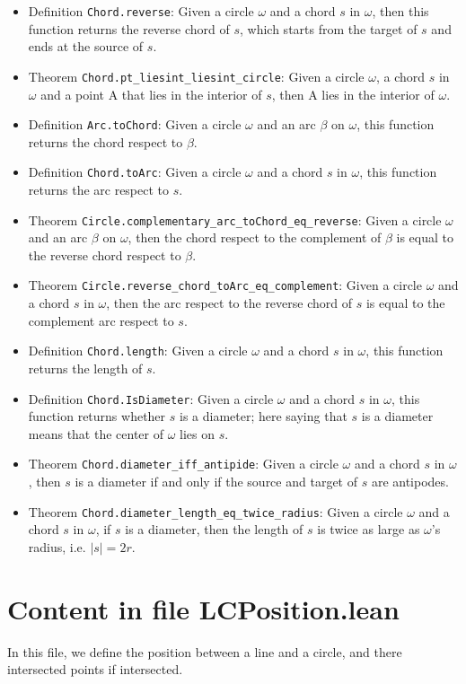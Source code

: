 \documentclass[12pt]{amsart}
\begin{document}
\begin{itemize}
    \item Definition \verb|Chord.reverse|: Given a circle $\omega$ and a chord $s$ in $\omega$, then this function returns the reverse chord of $s$, which starts from the target of $s$ and ends at the source of $s$.
    \item Theorem \verb|Chord.pt_liesint_liesint_circle|: Given a circle $\omega$, a chord $s$ in $\omega$ and a point A that lies in the interior of $s$, then A lies in the interior of $\omega$.
    \item Definition \verb|Arc.toChord|: Given a circle $\omega$ and an arc $\beta$ on $\omega$, this function returns the chord respect to $\beta$.
    \item Definition \verb|Chord.toArc|: Given a circle $\omega$ and a chord $s$ in $\omega$, this function returns the arc respect to $s$.
    \item Theorem \verb|Circle.complementary_arc_toChord_eq_reverse|: Given a circle $\omega$ and an arc $\beta$ on $\omega$, then the chord respect to the complement of $\beta$ is equal to the reverse chord respect to $\beta$.
    \item Theorem \verb|Circle.reverse_chord_toArc_eq_complement|: Given a circle $\omega$ and a chord $s$ in $\omega$, then the arc respect to the reverse chord of $s$ is equal to the complement arc respect to $s$.
    \item Definition \verb|Chord.length|: Given a circle $\omega$ and a chord $s$ in $\omega$, this function returns the length of $s$.
    \item Definition \verb|Chord.IsDiameter|: Given a circle $\omega$ and a chord $s$ in $\omega$, this function returns whether $s$ is a diameter; here saying that $s$ is a diameter means that the center of $\omega$ lies on $s$.
    \item Theorem \verb|Chord.diameter_iff_antipide|: Given a circle $\omega$ and a chord $s$ in $\omega$, then $s$ is a diameter if and only if the source and target of $s$ are antipodes.
    \item Theorem \verb|Chord.diameter_length_eq_twice_radius|: Given a circle $\omega$ and a chord $s$ in $\omega$, if $s$ is a diameter, then the length of $s$ is twice as large as $\omega$'s radius, i.e. $|s|=2r$.
\end{itemize}


\section{Content in file LCPosition.lean}
In this file, we define the position between a line and a circle, and there intersected points if intersected.
\end{document}
